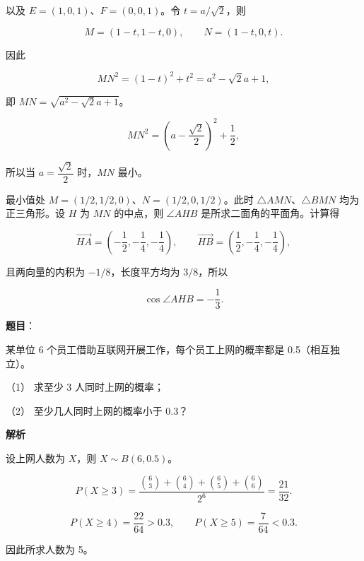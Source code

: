 \begin{answer}
以及 $E=(1,0,1)$、$F=(0,0,1)$。令 $t=a/\sqrt2$，则

\nopagebreak[4]
\[
M=(1-t,1-t,0),\qquad N=(1-t,0,t).
\]

因此

\nopagebreak[4]
\[
MN^2=(1-t)^2+t^2=a^2-\sqrt2a+1,
\]

即 $MN=\sqrt{a^2-\sqrt2a+1}$。


\nopagebreak[4]
\[
MN^2=\left(a-\frac{\sqrt2}{2}\right)^2+\frac12,
\]

所以当 $a=\dfrac{\sqrt2}{2}$ 时，$MN$ 最小。


最小值处 $M=(1/2,1/2,0)$、$N=(1/2,0,1/2)$。此时 $\triangle AMN$、$\triangle BMN$ 均为正三角形。设 $H$ 为 $MN$ 的中点，则 $\angle AHB$ 是所求二面角的平面角。计算得

\nopagebreak[4]
\[
\overrightarrow{HA}=\left(-\frac12,-\frac14,-\frac14\right),\qquad
\overrightarrow{HB}=\left(\frac12,-\frac14,-\frac14\right),
\]

且两向量的内积为 $-1/8$，长度平方均为 $3/8$，所以

\nopagebreak[4]
\[
\cos\angle AHB=-\frac13.
\]




\end{answer}
\begin{answer}

\textbf{题目}：

某单位 6 个员工借助互联网开展工作，每个员工上网的概率都是 0.5（相互独立）。

（1） 求至少 3 人同时上网的概率；

（2） 至少几人同时上网的概率小于 0.3？

\textbf{解析}

设上网人数为 $X$，则 $X\sim B(6,0.5)$。


\nopagebreak[4]
\[
P(X\geqslant3)
=\frac{\binom63+\binom64+\binom65+\binom66}{2^6}
=\frac{21}{32}.
\]


\nopagebreak[4]
\[
P(X\geqslant4)=\frac{22}{64}>0.3,\qquad
P(X\geqslant5)=\frac7{64}<0.3.
\]

因此所求人数为 5。



\end{answer}
